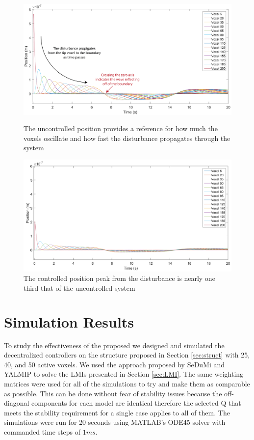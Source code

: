 \documentclass[11pt]{ucthesis}
\begin{document}
\begin{figure}
\centering
\includegraphics[width=0.8\linewidth]{Figures/UnControlledPosition-01.png}
\caption{The uncontrolled position provides a reference for how much the voxels oscillate and how fast the disturbance propagates through the system}
\label{fig:UCPos}
\vspace*{\floatsep}
\includegraphics[width=0.8\linewidth]{Figures/Position40Controlled12_10_2016.png}
\caption{The controlled position peak from the disturbance is nearly one third that of the uncontrolled system}
\label{fig:CPos}
\end{figure}

\section{Simulation Results}
\label{sec:results}
To study the effectiveness of the proposed we designed and simulated the decentralized controllers on the structure proposed in Section \ref{sec:struct} with 25, 40, and 50 active voxels. We used the approach proposed by SeDuMi and YALMIP \cite{lofberg2004yalmip} to solve the LMIs presented in Section \ref{sec:LMI}. The same weighting matrices were used for all of the simulations to try and make them as comparable as possible. This can be done without fear of stability issues because the off-diagonal components for each model are identical therefore the selected Q that meets the stability requirement for a single case applies to all of them. The simulations were run for 20 seconds using MATLAB's ODE45 solver with commanded time steps of $1ms$.
\end{document}
